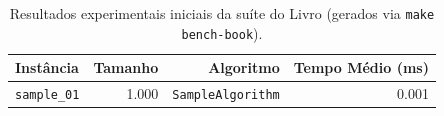 \begin{table}[!ht]
\centering
\small
\begin{tabular}{lrrr}
\toprule
\textbf{Instância} & \textbf{Tamanho} & \textbf{Algoritmo} & \textbf{Tempo Médio (ms)} \\
\midrule
\texttt{sample\_01} & 1.000 & \texttt{SampleAlgorithm} & 0.001 \\
\bottomrule
\end{tabular}
\caption{Resultados experimentais iniciais da suíte do Livro (gerados via \texttt{make bench-book}).}
\label{tab:results_book}
\end{table}
